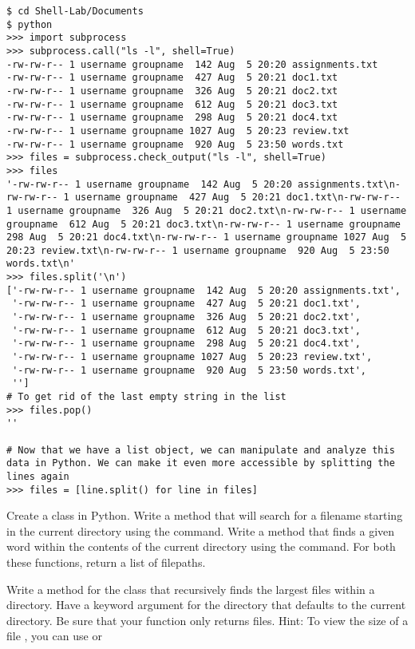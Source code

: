 \begin{lstlisting}
$ cd Shell-Lab/Documents
$ python
>>> import subprocess
>>> subprocess.call("ls -l", shell=True)
-rw-rw-r-- 1 username groupname  142 Aug  5 20:20 assignments.txt
-rw-rw-r-- 1 username groupname  427 Aug  5 20:21 doc1.txt
-rw-rw-r-- 1 username groupname  326 Aug  5 20:21 doc2.txt
-rw-rw-r-- 1 username groupname  612 Aug  5 20:21 doc3.txt
-rw-rw-r-- 1 username groupname  298 Aug  5 20:21 doc4.txt
-rw-rw-r-- 1 username groupname 1027 Aug  5 20:23 review.txt
-rw-rw-r-- 1 username groupname  920 Aug  5 23:50 words.txt
>>> files = subprocess.check_output("ls -l", shell=True)
>>> files
'-rw-rw-r-- 1 username groupname  142 Aug  5 20:20 assignments.txt\n-rw-rw-r-- 1 username groupname  427 Aug  5 20:21 doc1.txt\n-rw-rw-r-- 1 username groupname  326 Aug  5 20:21 doc2.txt\n-rw-rw-r-- 1 username groupname  612 Aug  5 20:21 doc3.txt\n-rw-rw-r-- 1 username groupname  298 Aug  5 20:21 doc4.txt\n-rw-rw-r-- 1 username groupname 1027 Aug  5 20:23 review.txt\n-rw-rw-r-- 1 username groupname  920 Aug  5 23:50 words.txt\n'
>>> files.split('\n')
['-rw-rw-r-- 1 username groupname  142 Aug  5 20:20 assignments.txt',
 '-rw-rw-r-- 1 username groupname  427 Aug  5 20:21 doc1.txt',
 '-rw-rw-r-- 1 username groupname  326 Aug  5 20:21 doc2.txt',
 '-rw-rw-r-- 1 username groupname  612 Aug  5 20:21 doc3.txt',
 '-rw-rw-r-- 1 username groupname  298 Aug  5 20:21 doc4.txt',
 '-rw-rw-r-- 1 username groupname 1027 Aug  5 20:23 review.txt',
 '-rw-rw-r-- 1 username groupname  920 Aug  5 23:50 words.txt',
 '']
# To get rid of the last empty string in the list
>>> files.pop()
''

# Now that we have a list object, we can manipulate and analyze this data in Python. We can make it even more accessible by splitting the lines again
>>> files = [line.split() for line in files]
\end{lstlisting}

\begin{problem}
Create a  class in Python. Write a  method that will search for a filename starting in the current directory using the  command. Write a  method that finds a given word within the contents of the current directory using the  command. For both these functions, return a list of filepaths.
\end{problem}

\begin{problem}
Write a method for the  class that recursively finds the  largest files within a directory. Have a keyword argument for the directory that defaults to the current directory. Be sure that your function only returns files. Hint: To view the size of a file , you can use  or 
\end{problem}

